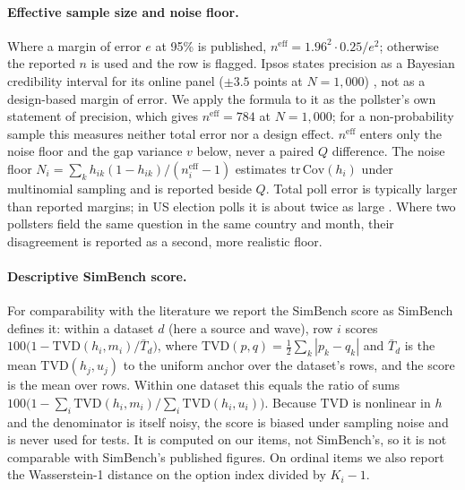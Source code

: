 \documentclass[11pt]{article}
\newcommand{\TVD}{\mathrm{TVD}}
\begin{document}
\paragraph{Effective sample size and noise floor.} Where a margin of error $e$ at 95\% is published, $n^{\mathrm{eff}} = 1.96^2 \cdot 0.25 / e^2$; otherwise the reported $n$ is used and the row is flagged. Ipsos states precision as a Bayesian credibility interval for its online panel ($\pm 3.5$ points at $N = 1{,}000$) \citep{ipsos2026may}, not as a design-based margin of error. We apply the formula to it as the pollster's own statement of precision, which gives $n^{\mathrm{eff}} = 784$ at $N = 1{,}000$; for a non-probability sample this measures neither total error nor a design effect. $n^{\mathrm{eff}}$ enters only the noise floor and the gap variance $v$ below, never a paired $Q$ difference. The noise floor $N_i = \sum_k h_{ik}(1-h_{ik})/(n^{\mathrm{eff}}_i - 1)$ estimates $\mathrm{tr}\,\mathrm{Cov}(h_i)$ under multinomial sampling and is reported beside $Q$. Total poll error is typically larger than reported margins; in US election polls it is about twice as large \citep{shiranimehr2018}. Where two pollsters field the same question in the same country and month, their disagreement is reported as a second, more realistic floor.

\paragraph{Descriptive SimBench score.} For comparability with the literature we report the SimBench score \citep{hu2026simbench} as SimBench defines it: within a dataset $d$ (here a source and wave), row $i$ scores $100\bigl(1 - \TVD(h_i, m_i)/\bar T_d\bigr)$, where $\TVD(p,q) = \tfrac{1}{2}\sum_k |p_k - q_k|$ and $\bar T_d$ is the mean $\TVD(h_j, u_j)$ to the uniform anchor over the dataset's rows, and the score is the mean over rows. Within one dataset this equals the ratio of sums $100\bigl(1 - \sum_i \TVD(h_i,m_i)/\sum_i \TVD(h_i,u_i)\bigr)$. Because $\TVD$ is nonlinear in $h$ and the denominator is itself noisy, the score is biased under sampling noise and is never used for tests. It is computed on our items, not SimBench's, so it is not comparable with SimBench's published figures. On ordinal items we also report the Wasserstein-1 distance on the option index divided by $K_i-1$.
\end{document}
